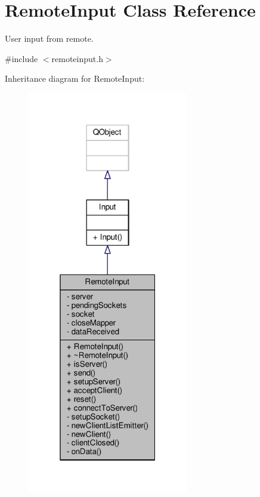 \hypertarget{classRemoteInput}{}\section{Remote\+Input Class Reference}
\label{classRemoteInput}


User input from remote.  




{\ttfamily \#include $<$remoteinput.\+h$>$}



Inheritance diagram for Remote\+Input\+:
\nopagebreak
\begin{figure}[H]
\begin{center}
\leavevmode
\includegraphics[width=199pt]{classRemoteInput__inherit__graph}
\end{center}
\end{figure}


